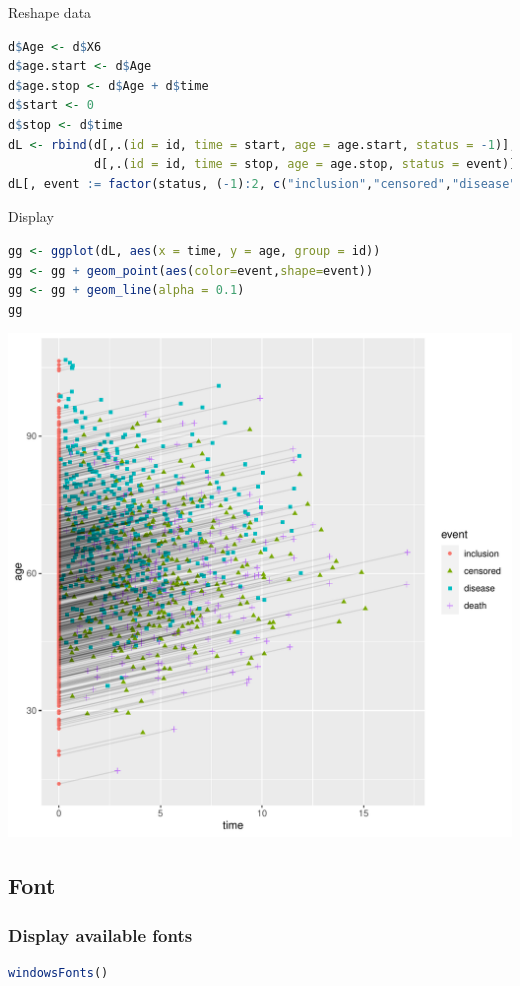 \documentclass{article}
\begin{document}
Reshape data
\begin{lstlisting}[language=r,numbers=none]
d$Age <- d$X6
d$age.start <- d$Age
d$age.stop <- d$Age + d$time
d$start <- 0
d$stop <- d$time
dL <- rbind(d[,.(id = id, time = start, age = age.start, status = -1)],
            d[,.(id = id, time = stop, age = age.stop, status = event)])
dL[, event := factor(status, (-1):2, c("inclusion","censored","disease","death"))]
\end{lstlisting}
Display
\begin{lstlisting}[language=r,numbers=none]
gg <- ggplot(dL, aes(x = time, y = age, group = id))
gg <- gg + geom_point(aes(color=event,shape=event)) 
gg <- gg + geom_line(alpha = 0.1) 
gg
\end{lstlisting}

\begin{center}
\includegraphics[width=1\textwidth]{./figures/fig-gg-lexis.pdf}
\end{center}
\subsection{Font}
\label{sec:orge739951}
\subsubsection{Display available fonts}
\label{sec:org950b2a5}
\begin{lstlisting}[language=r,numbers=none]
windowsFonts()
\end{lstlisting}
\end{document}
